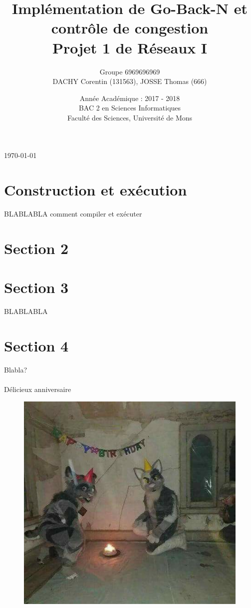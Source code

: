 \documentclass[11pt]{article}
\begin{document}
\title{ \huge
  Implémentation de Go-Back-N et contrôle de congestion \\
  \Large Projet 1 de Réseaux I \\}

\author{Groupe 6969696969\\DACHY Corentin (131563), JOSSE Thomas (666)}

\date{Année Académique : 2017 - 2018\\
BAC 2 en Sciences Informatiques\\
\vspace{1cm}
Faculté des Sciences, Université de Mons}

\maketitle

\bigskip
\begin{center} \today \end{center}

\newpage

\section{Construction et exécution}
BLABLABLA comment compiler et exécuter


\section{Section 2}
\section{Section 3}
BLABLABLA
\section{Section 4}
Blabla?
\\ \\ Délicieux anniversaire
\begin{figure}[h]
  \includegraphics[scale=0.7]{HP.png}
\end{figure}
\end{document}
